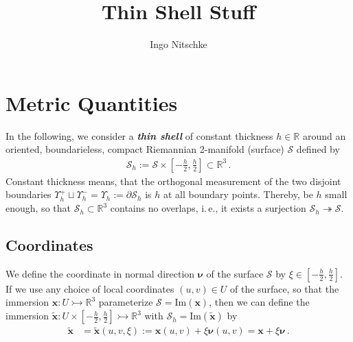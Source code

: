 \documentclass[a4paper,11pt]{scrartcl}
\title{Thin Shell Stuff}
\author{Ingo Nitschke}
\newcommand{\surf}{\mathcal{S}}
\newcommand{\surfh}{\surf_{h}}
\newcommand{\R}{\mathbb{R}}
\renewcommand{\Im}{\text{Im}}
\newcommand{\xb}{\mathbf{x}}
\newcommand{\txb}{\tilde{\xb}}
\newcommand{\nub}{\bm{\nu}}
\newcommand{\boundary}[1]{\Upsilon_{h}^{#1}}
\newcommand{\formPeriod}{\,\text{.}}
\newcommand{\ie}{i.\,e.}%
\newcommand{\newterm}[1]{\textbf{\textit{#1}}}
\begin{document}
\maketitle
\tableofcontents

\section{Metric Quantities}
In the following, we consider a \newterm{thin shell} of constant thickness \( h\in\R \) around an oriented, boundarieless, compact Riemannian 2-manifold (surface) \( \surf \)
defined by
\begin{align}
 \surfh := \surf\times\left[ -\frac{h}{2}, \frac{h}{2} \right] \subset \R^{3} \formPeriod
\end{align}
Constant thickness means, that the orthogonal measurement of the  two disjoint boundaries \( \boundary{+}\sqcup\boundary{-} = \boundary{} :=\partial\surfh \) is \( h \)
at all boundary points.
Thereby, be \( h \) small enough, so that  \( \surfh\subset \R^{3} \) contains no overlaps,
\ie, it exists a surjection \( \surfh \twoheadrightarrow \surf \).

\subsection{Coordinates}
We define the coordinate in normal direction \( \nub \) of the surface \( \surf \) by \( \xi\in\left[ -\frac{h}{2}, \frac{h}{2} \right] \).
If we use any choice of local coordinates \( (u,v)\in U \) of the surface, so that the immersion 
\( \xb:U \rightarrowtail \R^{3} \) parameterize \( \surf= \Im(\xb)\),
then we can define the immersion \( \txb: U\times\left[ -\frac{h}{2}, \frac{h}{2} \right] \rightarrowtail \R^{3} \) with  \( \surfh= \Im(\txb)\) by
\begin{align}
  \txb &= \txb(u,v,\xi) := \xb(u,v) + \xi\nub(u,v) = \xb + \xi\nub\formPeriod 
\end{align}
\end{document}
